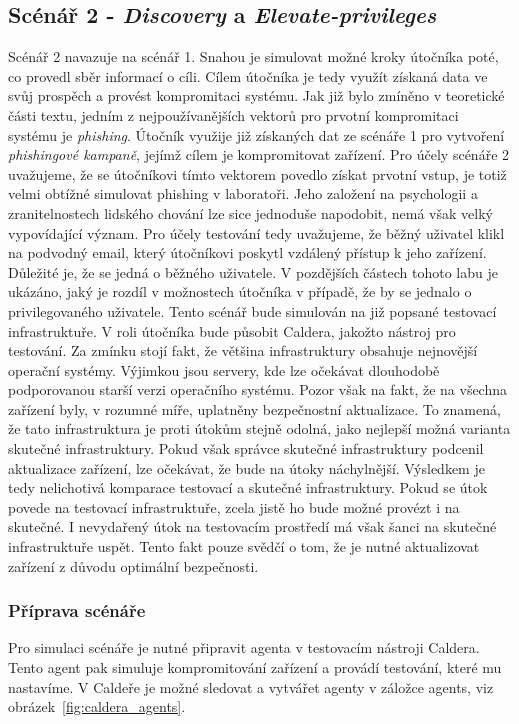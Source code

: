 \subsection{Scénář 2 - \textit{Discovery} a \textit{Elevate-privileges}}
Scénář 2 navazuje na scénář 1.
Snahou je simulovat možné kroky útočníka poté, co provedl sběr informací o cíli.
Cílem útočníka je tedy využít získaná data ve svůj prospěch a provést kompromitaci systému.
Jak již bylo zmíněno v teoretické části textu, jedním z nejpoužívanějších vektorů pro prvotní kompromitaci systému je \textit{phishing}.
Útočník využije již získaných dat ze scénáře 1 pro vytvoření \textit{phishingové kampaně}, jejímž cílem je kompromitovat zařízení.
Pro účely scénáře 2 uvažujeme, že se útočníkovi tímto vektorem povedlo získat prvotní vstup, je totiž velmi obtížné simulovat phishing v laboratoři.
Jeho založení na psychologii a zranitelnostech lidského chování lze sice jednoduše napodobit, nemá však velký vypovídající význam.
Pro účely testování tedy uvažujeme, že běžný uživatel klikl na podvodný email, který útočníkovi poskytl vzdálený přístup k jeho zařízení.
Důležité je, že se jedná o běžného uživatele.
V pozdějších částech tohoto labu je ukázáno, jaký je rozdíl v možnostech útočníka v případě, že by se jednalo o privilegovaného uživatele.
Tento scénář bude simulován na již popsané testovací infrastruktuře.
V roli útočníka bude působit Caldera, jakožto nástroj pro testování.
Za zmínku stojí fakt, že většina infrastruktury obsahuje nejnovější operační systémy.
Výjimkou jsou servery, kde lze očekávat dlouhodobě podporovanou starší verzi operačního systému.
Pozor však na fakt, že na všechna zařízení byly, v rozumné míře, uplatněny bezpečnostní aktualizace.
To znamená, že tato infrastruktura je proti útokům stejně odolná, jako nejlepší možná varianta skutečné infrastruktury.
Pokud však správce skutečné infrastruktury podcenil aktualizace zařízení, lze očekávat, že bude na útoky náchylnější.
Výsledkem je tedy nelichotivá komparace testovací a skutečné infrastruktury.
Pokud se útok povede na testovací infrastruktuře, zcela jistě ho bude možné provézt i na skutečné.
I nevydařený útok na testovacím prostředí má však šanci na skutečné infrastruktuře uspět.
Tento fakt pouze svědčí o tom, že je nutné aktualizovat zařízení z důvodu optimální bezpečnosti.


\subsubsection{Příprava scénáře}
Pro simulaci scénáře je nutné připravit agenta v testovacím nástroji Caldera.
Tento agent pak simuluje kompromitování zařízení a provádí testování, které mu nastavíme.
V Caldeře je možné sledovat a vytvářet agenty v záložce agents, viz obrázek~\ref{fig:caldera_agents}.

